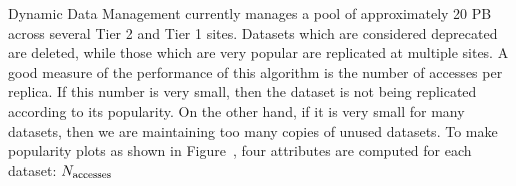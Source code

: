 Dynamic Data Management currently manages a pool of approximately 20 PB across several Tier 2 and Tier 1 sites. Datasets which are considered deprecated are deleted, while those which are very popular are replicated at multiple sites. A good measure of the performance of this algorithm is the number of accesses per replica. If this number is very small, then the dataset is not being replicated according to its popularity. On the other hand, if it is very small for many datasets, then we are maintaining too many copies of unused datasets. To make popularity plots as shown in Figure~, four attributes are computed for each dataset: $N_\text{accesses}$




